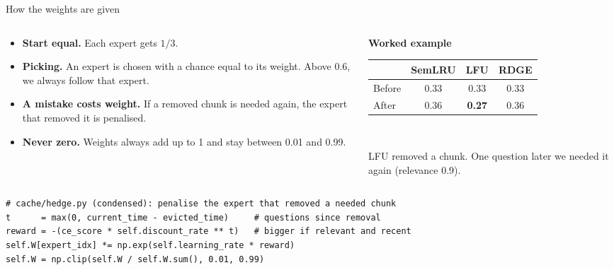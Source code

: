 \documentclass[aspectratio=169,11pt]{beamer}
\begin{document}
\begin{frame}[fragile]{How the weights are given}
\begin{columns}[T,onlytextwidth]
\begin{column}{0.57\textwidth}
\small
\begin{itemize}
  \setlength{\itemsep}{3pt}
  \item \textbf{Start equal.} Each expert gets $1/3$.
  \item \textbf{Picking.} An expert is chosen with a chance equal to its
        weight. Above 0.6, we always follow that expert.
  \item \textbf{A mistake costs weight.} If a removed chunk is needed
        again, the expert that removed it is penalised.
  \item \textbf{Never zero.} Weights always add up to 1 and stay between
        0.01 and 0.99.
\end{itemize}
\end{column}
\begin{column}{0.40\textwidth}
\small
\textbf{Worked example}\\[2pt]
\begin{tabular}{@{}lccc@{}}
\toprule
 & SemLRU & LFU & RDGE \\
\midrule
Before & 0.33 & 0.33 & 0.33 \\
After  & 0.36 & \textcolor{cmhot}{\textbf{0.27}} & 0.36 \\
\bottomrule
\end{tabular}\\[3pt]
{\footnotesize\color{cmgrey}
LFU removed a chunk. One question later we needed it again
(relevance 0.9).\par}
\end{column}
\end{columns}
\vspace{4pt}
\begin{lstlisting}
# cache/hedge.py (condensed): penalise the expert that removed a needed chunk
t      = max(0, current_time - evicted_time)     # questions since removal
reward = -(ce_score * self.discount_rate ** t)   # bigger if relevant and recent
self.W[expert_idx] *= np.exp(self.learning_rate * reward)
self.W = np.clip(self.W / self.W.sum(), 0.01, 0.99)
\end{lstlisting}
\end{frame}
\end{document}
